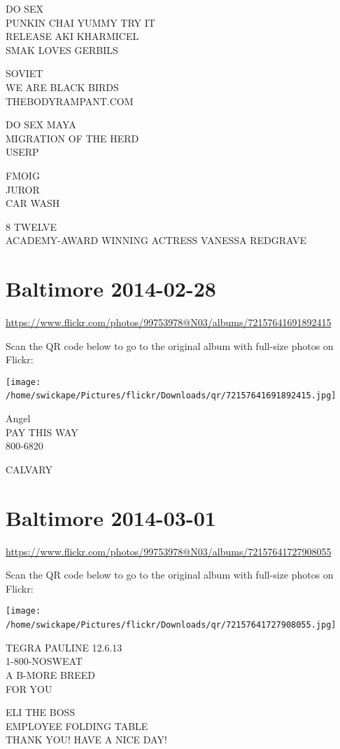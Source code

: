 \documentclass[10pt,letterpaper]{article}
\begin{document}
DO SEX\\
PUNKIN CHAI YUMMY TRY IT\\
RELEASE AKI KHARMICEL\\
SMAK LOVES GERBILS

SOVIET\\
WE ARE BLACK BIRDS\\
THEBODYRAMPANT.COM

DO SEX MAYA\\
MIGRATION OF THE HERD\\
USERP

FMOIG\\
JUROR\\
CAR WASH

8 TWELVE\\
ACADEMY{-}AWARD WINNING ACTRESS VANESSA REDGRAVE
\

\section*{Baltimore 2014-02-28}

\url{https://www.flickr.com/photos/99753978@N03/albums/72157641691892415}

Scan the QR code below to go to the original album with full-size photos on Flickr:

\texttt{[image: /home/swickape/Pictures/flickr/Downloads/qr/72157641691892415.jpg]}
\

Angel\\
PAY THIS WAY\\
800{-}6820

CALVARY
\

\section*{Baltimore 2014-03-01}

\url{https://www.flickr.com/photos/99753978@N03/albums/72157641727908055}

Scan the QR code below to go to the original album with full-size photos on Flickr:

\texttt{[image: /home/swickape/Pictures/flickr/Downloads/qr/72157641727908055.jpg]}
\

TEGRA PAULINE 12.6.13\\
1{-}800{-}NOSWEAT\\
A B{-}MORE BREED\\
FOR YOU

ELI THE BOSS\\
EMPLOYEE FOLDING TABLE\\
THANK YOU!  HAVE A NICE DAY!
\end{document}
